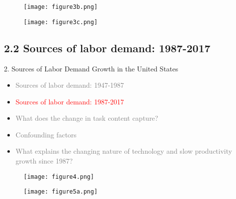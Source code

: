 \documentclass[notes=show]{beamer}
\begin{document}
\newpage
\begin{center}
\begin{figure}
\texttt{[image: figure3b.png]}
\end{figure} 
\end{center}
\newpage

\newpage
\begin{center}
\begin{figure}
\texttt{[image: figure3c.png]}
\end{figure} 
\end{center}
\newpage

\subsection{2.2 Sources of labor demand: 1987-2017}

\begin{frame}{2. Sources of Labor Demand Growth in the United States}
\begin{itemize}
\item[\textcolor{gray}{2.1}] \textcolor{gray}{Sources of labor demand: 1947-1987} \medskip
\item[\textcolor{red}{2.2}] \textcolor{red}{Sources of labor demand: 1987-2017} \medskip
\item[\textcolor{gray}{2.3}] \textcolor{gray}{What does the change in task content capture?} \medskip
\item[\textcolor{gray}{2.4}] \textcolor{gray}{Confounding factors} \medskip
\item[\textcolor{gray}{2.5}] \textcolor{gray}{What explains the changing nature of technology and slow productivity growth since 1987?} 
\end{itemize}
\end{frame}

\newpage
\begin{center}
\begin{figure}
\texttt{[image: figure4.png]}
\end{figure} 
\end{center}
\newpage

\newpage
\begin{center}
\begin{figure}
\texttt{[image: figure5a.png]}
\end{figure} 
\end{center}
\newpage
\end{document}
